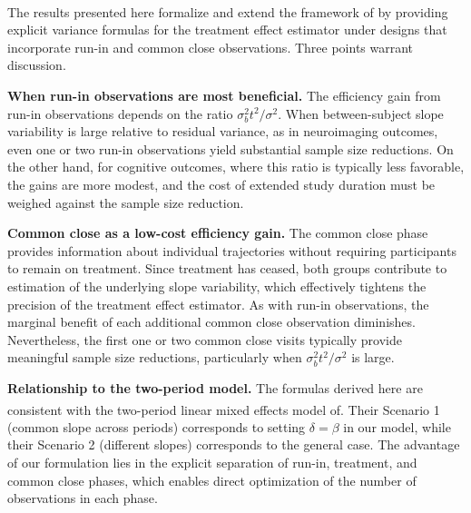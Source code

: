 \documentclass[
  11pt,
]{article}
\begin{document}
The results presented here formalize and extend the framework
of\textsuperscript{} by providing explicit
variance formulas for the treatment effect estimator under
designs that incorporate run-in and common close observations.
Three points warrant discussion.

\textbf{When run-in observations are most beneficial.} The
efficiency gain from run-in observations depends on the ratio
\(\sigma_b^2 t^2 / \sigma^2\). When between-subject slope
variability is large relative to residual variance, as in
neuroimaging outcomes, even one or two run-in observations
yield substantial sample size reductions. On the other hand,
for cognitive outcomes, where this ratio is typically less
favorable, the gains are more modest, and the cost of extended
study duration must be weighed against the sample size
reduction.

\textbf{Common close as a low-cost efficiency gain.} The common
close phase provides information about individual trajectories
without requiring participants to remain on treatment. Since
treatment has ceased, both groups contribute to estimation of
the underlying slope variability, which effectively tightens
the precision of the treatment effect estimator. As with
run-in observations, the marginal benefit of each additional
common close observation diminishes. Nevertheless, the first
one or two common close visits typically provide meaningful
sample size reductions, particularly when \(\sigma_b^2 t^2 /
\sigma^2\) is large.

\textbf{Relationship to the two-period model.} The formulas
derived here are consistent with the two-period linear mixed
effects model of\textsuperscript{}. Their Scenario 1
(common slope across periods) corresponds to setting
\(\delta = \beta\) in our model, while their Scenario 2
(different slopes) corresponds to the general case. The
advantage of our formulation lies in the explicit separation
of run-in, treatment, and common close phases, which enables
direct optimization of the number of observations in each
phase.
\end{document}
